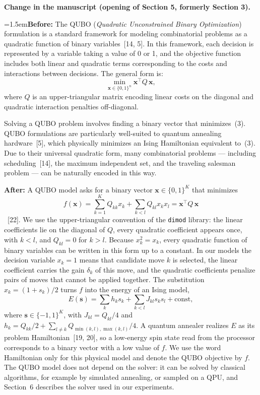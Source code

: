 \documentclass[12pt]{article}
\newcommand{\change}[3]{\par\smallskip\noindent\textbf{Change in the manuscript (#1).}\par
  {\leftskip=1.5em\noindent\textbf{Before:} #2\par\noindent\textbf{After:} #3\par}}
\begin{document}
\change{opening of Section 5, formerly Section 3}{The QUBO (\emph{Quadratic Unconstrained Binary Optimization}) formulation is a standard framework for modeling combinatorial problems as a quadratic function of binary variables~[14, 5]. In this framework, each decision is represented by a variable taking a value of 0 or 1, and the objective function includes both linear and quadratic terms corresponding to the costs and interactions between decisions. The general form is:
\begin{equation}
    \min_{\mathbf{x}\in\{0,1\}^n} \mathbf{x}^\top Q\,\mathbf{x},
\end{equation}
where $Q$ is an upper-triangular matrix encoding linear costs on the diagonal and quadratic interaction penalties off-diagonal.

Solving a QUBO problem involves finding a binary vector that minimizes~(3). QUBO formulations are particularly well-suited to quantum annealing hardware~[5], which physically minimizes an Ising Hamiltonian equivalent to~(3). Due to their universal quadratic form, many combinatorial problems — including scheduling~[14], the maximum independent set, and the traveling salesman problem — can be naturally encoded in this way.}{A QUBO model asks for a binary vector $\mathbf{x}\in\{0,1\}^K$ that minimizes
\begin{equation}
f(\mathbf{x})=\sum_{k=1}^{K}Q_{kk}x_k+\sum_{k<l}Q_{kl}x_kx_l=\mathbf{x}^\top Q\,\mathbf{x}
\end{equation}
~[22]. We use the upper-triangular convention of the \texttt{dimod} library: the linear coefficients lie on the diagonal of $Q$, every quadratic coefficient appears once, with $k<l$, and $Q_{kl}=0$ for $k>l$. Because $x_k^2=x_k$, every quadratic function of binary variables can be written in this form up to a constant. In our models the decision variable $x_k=1$ means that candidate move $k$ is selected, the linear coefficient carries the gain $\delta_k$ of this move, and the quadratic coefficients penalize pairs of moves that cannot be applied together. The substitution $x_k=(1+s_k)/2$ turns $f$ into the energy of an Ising model,
\begin{equation}
E(\mathbf{s})=\sum_k h_ks_k+\sum_{k<l}J_{kl}s_ks_l+\text{const},
\end{equation}
where $\mathbf{s}\in\{-1,1\}^K$, with $J_{kl}=Q_{kl}/4$ and $h_k=Q_{kk}/2+\sum_{l\ne k}Q_{\min(k,l),\max(k,l)}/4$. A quantum annealer realizes $E$ as its problem Hamiltonian~[19, 20], so a low-energy spin state read from the processor corresponds to a binary vector with a low value of $f$. We use the word Hamiltonian only for this physical model and denote the QUBO objective by $f$. The QUBO model does not depend on the solver: it can be solved by classical algorithms, for example by simulated annealing, or sampled on a QPU, and Section~6 describes the solver used in our experiments.}
\end{document}
